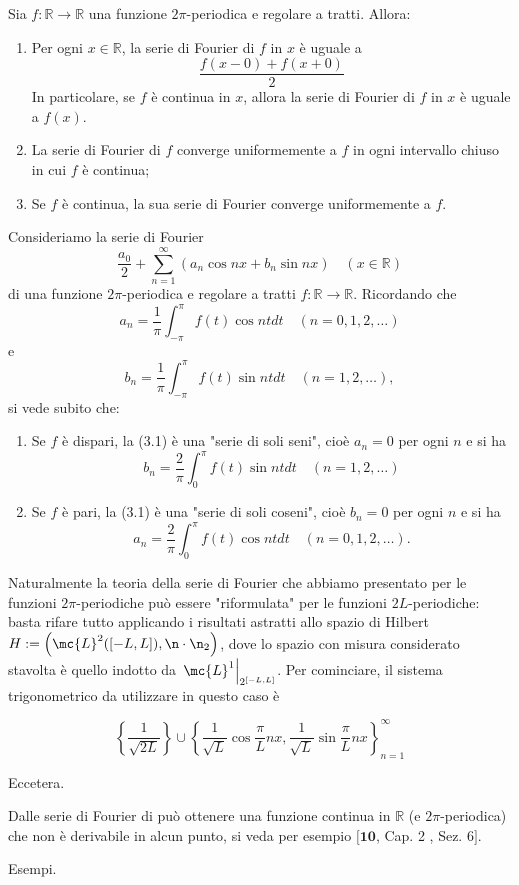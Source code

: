 \begin{shadedTheorem}
    Sia $f: \mathbb{R} \rightarrow \mathbb{R}$ una funzione $2 \pi$-periodica e regolare a tratti. Allora:
    \begin{enumerate}
        \item Per ogni $x \in \mathbb{R}$, la serie di Fourier di $f$ in $x$ è uguale a
        \[
        \frac{f(x-0)+f(x+0)}{2}
        \]
        In particolare, se $f$ è continua in $x$, allora la serie di Fourier di $f$ in $x$ è uguale a $f(x)$.
        \item La serie di Fourier di $f$ converge uniformemente a $f$ in ogni intervallo chiuso in cui $f$ è continua;
        \item Se $f$ è continua, la sua serie di Fourier converge uniformemente a $f$.
    \end{enumerate}
\end{shadedTheorem}

\begin{oss}
    Consideriamo la serie di Fourier
    \begin{equation}
    \frac{a_{0}}{2}+\sum_{n=1}^{\infty}\left(a_{n} \cos n x+b_{n} \sin n x\right) \quad(x \in \mathbb{R})
    \end{equation}
    di una funzione $2 \pi$-periodica e regolare a tratti $f: \mathbb{R} \rightarrow \mathbb{R}$. Ricordando che
    \[
    a_{n}=\frac{1}{\pi} \int_{-\pi}^{\pi} f(t) \cos n t d t \quad(n=0,1,2, \ldots)
    \]
    e
    \[
    b_{n}=\frac{1}{\pi} \int_{-\pi}^{\pi} f(t) \sin n t d t \quad(n=1,2, \ldots),
    \]
    si vede subito che:
    \begin{enumerate}
        \item Se $f$ è dispari, la (3.1) è una "serie di soli seni", cioè $a_{n}=0$ per ogni $n$ e si ha
        \[
        b_{n}=\frac{2}{\pi} \int_{0}^{\pi} f(t) \sin n t d t \quad(n=1,2, \ldots)
        \]
        \item Se $f$ è pari, la (3.1) è una "serie di soli coseni", cioè $b_{n}=0$ per ogni $n$ e si ha
        \[
        a_{n}=\frac{2}{\pi} \int_{0}^{\pi} f(t) \cos n t d t \quad(n=0,1,2, \ldots) .
        \]
    \end{enumerate}
\end{oss}

\begin{oss}
    Naturalmente la teoria della serie di Fourier che abbiamo presentato per le funzioni $2 \pi$-periodiche può essere "riformulata" per le funzioni $2 L$-periodiche: basta rifare tutto applicando i risultati astratti allo spazio di Hilbert $H:=\left(\mc{L}^{2}([-L, L]), \n  \cdot\n _{2} \right)$, dove lo spazio con misura considerato stavolta è quello indotto da $\left.\mc{L}^{1}\right|_{2^{[-L, L]}}$. Per cominciare, il sistema trigonometrico da utilizzare in questo caso è
    
    \[
        \left\{\frac{1}{\sqrt{2 L}}\right\} \cup\left\{\frac{1}{\sqrt{L}} \cos \frac{\pi}{L} n x, \frac{1}{\sqrt{L}} \sin \frac{\pi}{L} n x\right\}_{n=1}^{\infty}
    \]
\end{oss}

Eccetera.

\begin{oss}
    Dalle serie di Fourier di può ottenere una funzione continua in $\mathbb{R}$ (e $2 \pi$-periodica) che non è derivabile in alcun punto, si veda per esempio $[\mathbf{1 0}$, Cap. 2 , Sez. $6]$.
\end{oss}

Esempi.